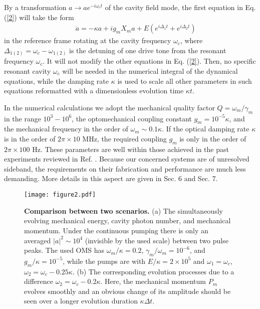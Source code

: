 \documentclass[a4paper,fleqn]{cas-dc}
\begin{document}
By a transformation $a\rightarrow ae^{-i\omega_c t}$ of the cavity field mode, the first equation in Eq. (\ref{2}) will take the form
\begin{eqnarray}
&&\dot{a}=-\kappa a+ig_mX_ma+E\left(e^{i\Delta_1 t}+e^{i\Delta_2 t}\right)
\label{eq}
\end{eqnarray}
in the reference frame rotating at the cavity frequency $\omega_c$, where $\Delta_{1(2)}=\omega_c-\omega_{1(2)}$ is the detuning of one drive tone from the resonant frequency $\omega_c$. It will not modify the other equations in Eq. (\ref{2}). Then, no specific resonant cavity $\omega_c$ will be needed in the numerical integral of the dynamical equations, while the damping rate $\kappa$ is used to scale all other parameters in such equations reformatted with a dimensionless evolution time $\kappa t$. 

In the numerical calculations we adopt the mechanical quality factor $Q=\omega_m/\gamma_m$ in the range $10^{3}-10^{6}$, the optomechanical coupling constant $g_m=10^{-5}\kappa$, and the mechanical frequency in the order of $\omega_m\sim 0.1\kappa$. If the optical damping rate $\kappa$ is in the order of $2\pi\times 10$ MHz, the required coupling $g_m$ is only in the order of $2\pi \times 100$ Hz. These parameters are well within those achieved in the past experiments reviewed in Ref. \cite{aspelmeyer2014cavity}. Because our concerned systems are of unresolved sideband, the requirements on their fabrication and performance are much less demanding. More details in this aspect are given in Sec. 6 and Sec. 7. 

\begin{figure}
	\centering
		\texttt{[image: figure2.pdf]}
	\caption{{\bf Comparison between two scenarios.} 
(a) The simultaneously evolving mechanical energy, cavity photon number, 
and mechanical momentum. Under the continuous pumping there is only an averaged $|a|^2\sim 10^4$ 
(invisible by the used scale) between two pulse peaks. The used OMS has $\omega_m/\kappa=0.2$, $\gamma_m/\omega_m=10^{-6}$, and $g_m/\kappa=10^{-5}$, while the pumps are with $E/\kappa=2\times 10^5$ 
and $\omega_1=\omega_c$, $\omega_2=\omega_c-0.25\kappa$. 
(b) The corresponding evolution processes due to a difference $\omega_2=\omega_c-0.2\kappa$. 
Here, the mechanical momentum $P_m$ evolves smoothly and an obvious change of its amplitude should be seen over a longer evolution duration $\kappa\Delta t$.}
	\label{FIG:2}
\end{figure}
\end{document}
